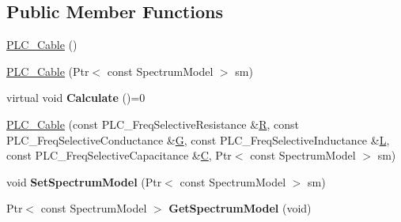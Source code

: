 \subsection*{\-Public \-Member \-Functions}
\begin{DoxyCompactItemize}
\item 
\hyperlink{classns3_1_1PLC__Cable_a2a854ceb780ea7385ebe956355ae6097}{\-P\-L\-C\-\_\-\-Cable} ()
\item 
\hyperlink{classns3_1_1PLC__Cable_ac833486bec03f0903a38e9627aaeadd8}{\-P\-L\-C\-\_\-\-Cable} (\-Ptr$<$ const \-Spectrum\-Model $>$ sm)
\item 
\hypertarget{classns3_1_1PLC__Cable_aa3349d90698a3705e3b64d54dc16464b}{virtual void {\bfseries \-Calculate} ()=0}\label{classns3_1_1PLC__Cable_aa3349d90698a3705e3b64d54dc16464b}

\item 
\hyperlink{classns3_1_1PLC__Cable_a732d4298d2e5a93d5265666b98fdd341}{\-P\-L\-C\-\_\-\-Cable} (const \-P\-L\-C\-\_\-\-Freq\-Selective\-Resistance \&\hyperlink{classns3_1_1PLC__Cable_a1770f66065636bde27fa4d8e35c8a534}{\-R}, const \-P\-L\-C\-\_\-\-Freq\-Selective\-Conductance \&\hyperlink{classns3_1_1PLC__Cable_af2c7882c896e9bc7f98121f7a3f25b53}{\-G}, const \-P\-L\-C\-\_\-\-Freq\-Selective\-Inductance \&\hyperlink{classns3_1_1PLC__Cable_a721d49ba4225f914d773d085c2d1f911}{\-L}, const \-P\-L\-C\-\_\-\-Freq\-Selective\-Capacitance \&\hyperlink{classns3_1_1PLC__Cable_a2443b8723d75123547011498d535fe48}{\-C}, \-Ptr$<$ const \-Spectrum\-Model $>$ sm)
\item 
\hypertarget{classns3_1_1PLC__Cable_a11cb52ebc04740af19c7fae83a7cb349}{void {\bfseries \-Set\-Spectrum\-Model} (\-Ptr$<$ const \-Spectrum\-Model $>$ sm)}\label{classns3_1_1PLC__Cable_a11cb52ebc04740af19c7fae83a7cb349}

\item 
\hypertarget{classns3_1_1PLC__Cable_ad47ce5cbdbf719822706e34b8cce11ec}{\-Ptr$<$ const \-Spectrum\-Model $>$ {\bfseries \-Get\-Spectrum\-Model} (void)}\label{classns3_1_1PLC__Cable_ad47ce5cbdbf719822706e34b8cce11ec}


\end{DoxyCompactItemize}
